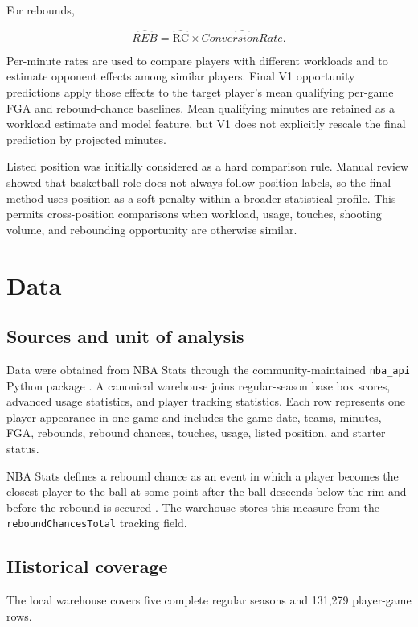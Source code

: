 \documentclass[11pt]{article}
\newcommand{\RC}{\mathrm{RC}}
\begin{document}
For rebounds,

\[
\widehat{REB}=\widehat{\RC}\times
\widehat{ConversionRate}.
\]

Per-minute rates are used to compare players with different workloads and to
estimate opponent effects among similar players. Final V1 opportunity
predictions apply those effects to the target player's mean qualifying
per-game FGA and rebound-chance baselines. Mean qualifying minutes are retained
as a workload estimate and model feature, but V1 does not explicitly rescale
the final prediction by projected minutes.

Listed position was initially considered as a hard comparison rule. Manual
review showed that basketball role does not always follow position labels, so
the final method uses position as a soft penalty within a broader statistical
profile. This permits cross-position comparisons when workload, usage,
touches, shooting volume, and rebounding opportunity are otherwise similar.

\section{Data}

\subsection{Sources and unit of analysis}

Data were obtained from NBA Stats through the community-maintained
\texttt{nba\_api} Python package \cite{nbaapi}. A canonical warehouse joins
regular-season base box scores, advanced usage statistics, and player tracking
statistics. Each row represents one player appearance in one game and includes
the game date, teams, minutes, FGA, rebounds, rebound chances, touches, usage,
listed position, and starter status.

NBA Stats defines a rebound chance as an event in which a player becomes the
closest player to the ball at some point after the ball descends below the rim
and before the rebound is secured \cite{nbaglossary}. The warehouse stores this
measure from the \texttt{reboundChancesTotal} tracking field.

\subsection{Historical coverage}

The local warehouse covers five complete regular seasons and 131,279
player-game rows.
\end{document}
